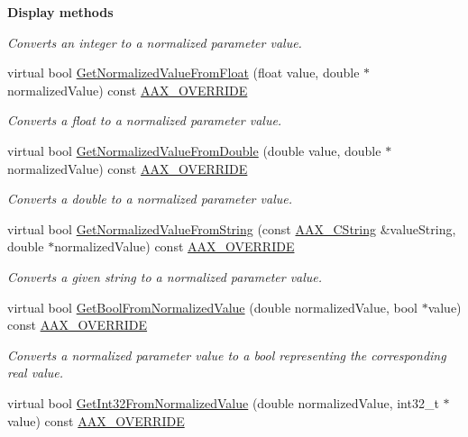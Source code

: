 \begin{Indent}{\bf Display methods}
\begin{DoxyCompactItemize}
\begin{DoxyCompactList}\small\item\em Converts an integer to a normalized parameter value. \end{DoxyCompactList}\item 
virtual bool \hyperlink{a00033_a43566eca44cfeb2d17f7f0a032438711}{Get\+Normalized\+Value\+From\+Float} (float value, double $\ast$normalized\+Value) const \hyperlink{a00149_ac2f24a5172689ae684344abdcce55463}{A\+A\+X\+\_\+\+O\+V\+E\+R\+R\+I\+D\+E}
\begin{DoxyCompactList}\small\item\em Converts a float to a normalized parameter value. \end{DoxyCompactList}\item 
virtual bool \hyperlink{a00033_a7e19b865b0aac3b5097f7a4d31596090}{Get\+Normalized\+Value\+From\+Double} (double value, double $\ast$normalized\+Value) const \hyperlink{a00149_ac2f24a5172689ae684344abdcce55463}{A\+A\+X\+\_\+\+O\+V\+E\+R\+R\+I\+D\+E}
\begin{DoxyCompactList}\small\item\em Converts a double to a normalized parameter value. \end{DoxyCompactList}\item 
virtual bool \hyperlink{a00033_aeec2d481aa68aefbe4675f0a381c28fd}{Get\+Normalized\+Value\+From\+String} (const \hyperlink{a00042}{A\+A\+X\+\_\+\+C\+String} \&value\+String, double $\ast$normalized\+Value) const \hyperlink{a00149_ac2f24a5172689ae684344abdcce55463}{A\+A\+X\+\_\+\+O\+V\+E\+R\+R\+I\+D\+E}
\begin{DoxyCompactList}\small\item\em Converts a given string to a normalized parameter value. \end{DoxyCompactList}\item 
virtual bool \hyperlink{a00033_a08a9421ee1cb94cae62df623d0a4cc37}{Get\+Bool\+From\+Normalized\+Value} (double normalized\+Value, bool $\ast$value) const \hyperlink{a00149_ac2f24a5172689ae684344abdcce55463}{A\+A\+X\+\_\+\+O\+V\+E\+R\+R\+I\+D\+E}
\begin{DoxyCompactList}\small\item\em Converts a normalized parameter value to a bool representing the corresponding real value. \end{DoxyCompactList}\item 
virtual bool \hyperlink{a00033_aab27c2807ac108ebaa114f599eacba5f}{Get\+Int32\+From\+Normalized\+Value} (double normalized\+Value, int32\+\_\+t $\ast$value) const \hyperlink{a00149_ac2f24a5172689ae684344abdcce55463}{A\+A\+X\+\_\+\+O\+V\+E\+R\+R\+I\+D\+E}

\end{DoxyCompactItemize}
\end{Indent}
